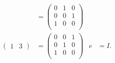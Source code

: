 \begin{questions}
\begin{parts}
\begin{solution}
\begin{align*}
          & =
        \begin{pmatrix}
          0 & 1 & 0 \\
          0 & 0 & 1 \\
          1 & 0 & 0 \\
        \end{pmatrix}
        \\
        \begin{pmatrix}
          1 & 3
        \end{pmatrix}
          & =
        \begin{pmatrix}
          0 & 0 & 1 \\
          0 & 1 & 0 \\
          1 & 0 & 0 \\
        \end{pmatrix}
          &
        e & = I.
      \end{align*}
    \end{solution}


\end{parts}
\end{questions}
